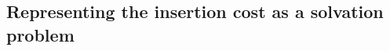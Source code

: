 \documentclass[11pt,twoside]{report}
\begin{document}

\subsection{Representing the insertion cost as a solvation problem}
\end{document}

